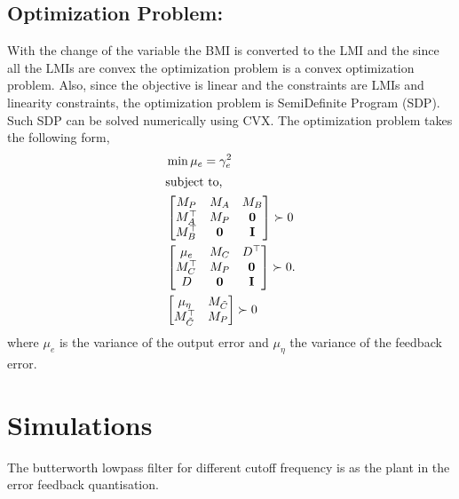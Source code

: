 \documentclass[a4paper]{article}
\begin{document}
\subsection{Optimization Problem:}
With the change of the variable the BMI is converted to the LMI and the since all the LMIs are convex the optimization problem is a convex optimization problem. Also, since the objective is linear and the constraints are LMIs and linearity constraints, the optimization problem is SemiDefinite Program (SDP). Such SDP can be solved numerically using CVX. The optimization problem takes the following form, 
\begin{align}
	&\min \mu_{e} = \gamma_{e}^{2} \\
	\intertext{subject to,} 	
	&\begin{bmatrix}
		M_{P} & M_{A} & M_{B}\\
		M_{A}^{\top} & M_{P} & \mathbf{0} \\
		M_{B}^{\top} & \mathbf{0} & \mathbf{I}
	\end{bmatrix} \succ 0 \label{eq:sdpcons1} \\
	&\begin{bmatrix}	
	\mu_{e} & M_{C} & D^{\top} \\
	M_{C}^{\top} & M_{P} & \mathbf{0} \\
	D & \mathbf{0} & \mathbf{I}
	\end{bmatrix} \succ 0 . \label{eq:sdpcons2} \\
	&\begin{bmatrix}
		\mu_{\eta} & M_{\tilde{C}} \\
		M_{\tilde{C}}^{\top} & M_{P}
	\end{bmatrix} \succ 0 \label{eq:sdpcons3}
\end{align}
where $\mu_{e}$ is the variance of the output error  and $\mu_{\eta} $ the variance of the feedback error. 

\section{Simulations}
The butterworth lowpass filter for different cutoff frequency is as the plant in the error feedback quantisation. 
\end{document}
